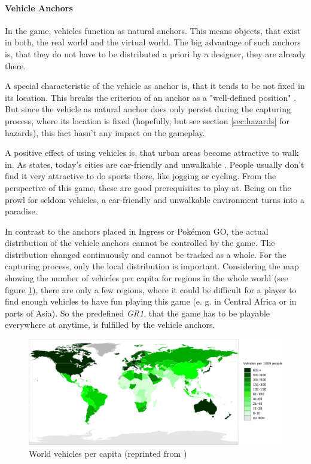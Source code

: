\paragraph{Vehicle Anchors}\label{par:vehicleAnchors}
In the game, vehicles function as natural anchors. This means objects, that exist in both, the real world and the virtual world. The big advantage of such anchors is, that they do not have to be distributed a priori by a designer, they are already there.

A special characteristic of the vehicle as anchor is, that it tends to be not fixed in its location. This breaks the criterion of an anchor as a "well-defined position" \citep{hock2014augmented}. But since the vehicle as natural anchor does only persist during the capturing process, where its location is fixed (hopefully, but see section \ref{sec:hazards} for hazards), this fact hasn't any impact on the gameplay.

A positive effect of using vehicles is, that urban areas become attractive to walk in. As \citeauthor{gehl2013cities} states, today's cities are car-friendly and unwalkable \citep{gehl2013cities}. People usually don't find it very attractive to do sports there, like jogging or cycling. From the perspective of this game, these are good prerequisites to play at. Being on the prowl for seldom vehicles, a car-friendly and unwalkable environment turns into a paradise.

In contrast to the anchors placed in Ingress or Pok\'{e}mon GO, the actual distribution of the vehicle anchors cannot be controlled by the game. The distribution changed continuously and cannot be tracked as a whole. For the capturing process, only the local distribution is important. Considering the map showing the number of vehicles per capita for regions in the whole world (see figure \ref{fig:worldVehicles}), there are only a few regions, where it could be difficult for a player to find enough vehicles to have fun playing this game (e. g. in Central Africa or in parts of Asia). So the predefined \emph{GR1}, that the game has to be playable everywhere at anytime, is fulfilled by the vehicle anchors.

\begin{figure}[btph]
  \centering
        \includegraphics[width=.95\linewidth]{gfx/world_vehicles_per_capita}
        \caption{World vehicles per capita (reprinted from \citep{capita})}
        \label{fig:worldVehicles}
\end{figure}


